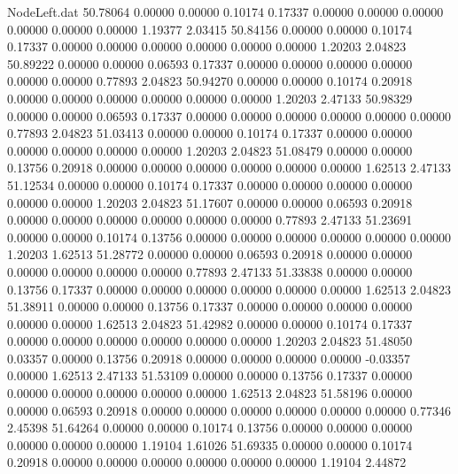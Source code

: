\begin{filecontents}{NodeLeft.dat}
  50.78064    0.00000    0.00000     0.10174    0.17337    0.00000    0.00000    0.00000    0.00000    0.00000    0.00000    1.19377    2.03415
  50.84156    0.00000    0.00000     0.10174    0.17337    0.00000    0.00000    0.00000    0.00000    0.00000    0.00000    1.20203    2.04823
  50.89222    0.00000    0.00000     0.06593    0.17337    0.00000    0.00000    0.00000    0.00000    0.00000    0.00000    0.77893    2.04823
  50.94270    0.00000    0.00000     0.10174    0.20918    0.00000    0.00000    0.00000    0.00000    0.00000    0.00000    1.20203    2.47133
  50.98329    0.00000    0.00000     0.06593    0.17337    0.00000    0.00000    0.00000    0.00000    0.00000    0.00000    0.77893    2.04823
  51.03413    0.00000    0.00000     0.10174    0.17337    0.00000    0.00000    0.00000    0.00000    0.00000    0.00000    1.20203    2.04823
  51.08479    0.00000    0.00000     0.13756    0.20918    0.00000    0.00000    0.00000    0.00000    0.00000    0.00000    1.62513    2.47133
  51.12534    0.00000    0.00000     0.10174    0.17337    0.00000    0.00000    0.00000    0.00000    0.00000    0.00000    1.20203    2.04823
  51.17607    0.00000    0.00000     0.06593    0.20918    0.00000    0.00000    0.00000    0.00000    0.00000    0.00000    0.77893    2.47133
  51.23691    0.00000    0.00000     0.10174    0.13756    0.00000    0.00000    0.00000    0.00000    0.00000    0.00000    1.20203    1.62513
  51.28772    0.00000    0.00000     0.06593    0.20918    0.00000    0.00000    0.00000    0.00000    0.00000    0.00000    0.77893    2.47133
  51.33838    0.00000    0.00000     0.13756    0.17337    0.00000    0.00000    0.00000    0.00000    0.00000    0.00000    1.62513    2.04823
  51.38911    0.00000    0.00000     0.13756    0.17337    0.00000    0.00000    0.00000    0.00000    0.00000    0.00000    1.62513    2.04823
  51.42982    0.00000    0.00000     0.10174    0.17337    0.00000    0.00000    0.00000    0.00000    0.00000    0.00000    1.20203    2.04823
  51.48050    0.03357    0.00000     0.13756    0.20918    0.00000    0.00000    0.00000    0.00000   -0.03357    0.00000    1.62513    2.47133
  51.53109    0.00000    0.00000     0.13756    0.17337    0.00000    0.00000    0.00000    0.00000    0.00000    0.00000    1.62513    2.04823
  51.58196    0.00000    0.00000     0.06593    0.20918    0.00000    0.00000    0.00000    0.00000    0.00000    0.00000    0.77346    2.45398
  51.64264    0.00000    0.00000     0.10174    0.13756    0.00000    0.00000    0.00000    0.00000    0.00000    0.00000    1.19104    1.61026
  51.69335    0.00000    0.00000     0.10174    0.20918    0.00000    0.00000    0.00000    0.00000    0.00000    0.00000    1.19104    2.44872

\end{filecontents}
